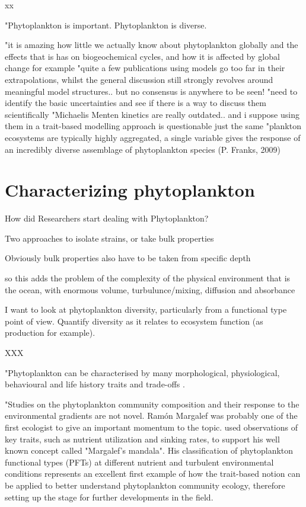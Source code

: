 xx


"Phytoplankton is important. Phytoplankton is diverse.

"it is amazing how little we actually know about phytoplankton globally and the effects that is has on biogeochemical cycles, and how it is affected by global change for example
"quite a few publications using models go too far in their extrapolations, whilst the general discussion still strongly revolves around meaningful model structures.. but no consensus is anywhere to be seen!
"need to identify the basic uncertainties and see if there is a way to discuss them scientifically
"Michaelis Menten kinetics are really outdated.. and i suppose using them in a trait-based modelling approach is questionable just the same
"plankton ecosystems are typically highly aggregated, a single variable gives the response of an incredibly diverse assemblage of phytoplankton species (P. Franks, 2009)


\section{Characterizing phytoplankton}
How did Researchers start dealing with Phytoplankton?

Two approaches to isolate strains, or take bulk properties

Obviously bulk properties also have to be taken from specific depth

so this adds the problem of the complexity of the physical environment that is the ocean, with enormous volume, turbulunce/mixing, diffusion and absorbance

I want to look at phytoplankton diversity, particularly from a functional type point of view. Quantify diversity as it relates to ecosystem function (as production for example).

XXX

"Phytoplankton can be characterised by many morphological, physiological, behavioural and life history traits and trade-offs \citep{Litchman2008, Litchman2010}.

"Studies on the phytoplankton community composition and their response to the environmental gradients are not novel. Ramón Margalef was probably one of the first ecologist to give an important momentum to the topic.  \citep{Margalef1978} used observations of key traits, such as nutrient utilization and sinking rates, to support his well known concept called "Margalef's mandala". His classification of phytoplankton functional types (PFTs) at different nutrient and turbulent environmental conditions represents an excellent first example of how the trait-based notion can be applied to better understand phytoplankton community ecology, therefore setting up the stage for further developments in the field.



